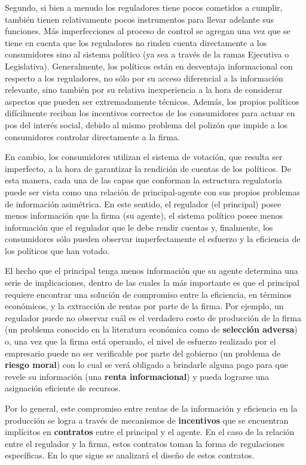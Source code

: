 \documentclass[
  12pt,
  spanish,
]{book}
\begin{document}
Segundo, si bien a menudo los reguladores tiene pocos cometidos a cumplir, también tienen relativamente pocos instrumentos para llevar adelante sus funciones. Más imperfecciones al proceso de control se agregan una vez que se tiene en cuenta que los reguladores no rinden cuenta directamente a los consumidores sino al sistema político (ya sea a través de la ramas Ejecutiva o Legislativa). Generalmente, los políticos están en desventaja informacional con respecto a los reguladores, no sólo por su acceso diferencial a la información relevante, sino también por su relativa inexperiencia a la hora de considerar aspectos que pueden ser extremadamente técnicos. Además, los propios políticos difícilmente reciban los incentivos correctos de los consumidores para actuar en pos del interés social, debido al mismo problema del polizón que impide a los consumidores controlar directamente a la firma.

En cambio, los consumidores utilizan el sistema de votación, que resulta ser imperfecto, a la hora de garantizar la
rendición de cuentas de los políticos. De esta manera, cada una de las capas que conforman la estructura regulatoria puede ser vista como una relación de principal-agente con sus propios problemas de información asimétrica. En este sentido, el regulador (el principal) posee menos información que la firma (su agente), el sistema político posee menos información que el regulador que le debe rendir cuentas y, finalmente, los consumidores sólo pueden observar imperfectamente el esfuerzo y la eficiencia de los políticos que han votado.

El hecho que el principal tenga menos información que su agente determina una serie de implicaciones, dentro de las cuales la más importante es que el principal requiere encontrar una solución de compromiso entre la eficiencia, en términos económicos, y la extracción de rentas por parte de la firma. Por ejemplo, un regulador puede no observar cuál es el verdadero costo de producción de la firma (un problema conocido en la literatura económica como de \textbf{selección adversa}) o, una vez que la firma está operando, el nivel de esfuerzo realizado por el empresario puede no ser verificable por parte del gobierno (un problema de \textbf{riesgo moral}) con lo cual se verá obligado a brindarle alguna pago para que revele su información (una \textbf{renta informacional}) y pueda lograrse una asignación eficiente de recursos.

Por lo general, este compromiso entre rentas de la información y eficiencia en la producción se logra a través de mecanismos de \textbf{incentivos} que se encuentran implícitos en \textbf{contratos} entre el principal y el agente. En el caso de la relación entre el regulador y la firma, estos contratos toman la forma de regulaciones específicas. En lo que sigue se analizará el diseño de estos contratos.
\end{document}
